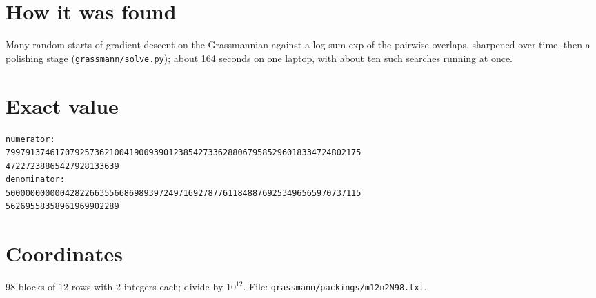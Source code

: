 \documentclass[11pt,a4paper]{article}
\begin{document}
\section{How it was found}
Many random starts of gradient descent on the Grassmannian against a log-sum-exp of the pairwise overlaps, sharpened over time, then a polishing stage (\texttt{grassmann/solve.py}); about 164 seconds on one laptop, with about ten such searches running at once.


\appendix
\section{Exact value}
{\small
\begin{verbatim}
numerator:
799791374617079257362100419009390123854273362880679585296018334724802175
47227238865427928133639
denominator:
500000000000428226635566869893972497169278776118488769253496565970737115
56269558358961969902289
\end{verbatim}}

\section{Coordinates}
98 blocks of 12 rows with 2 integers each; divide by $10^{12}$. File: \texttt{grassmann/packings/m12n2N98.txt}.
{\tiny
\begin{multicols}{4}
\end{multicols}}
\end{document}
